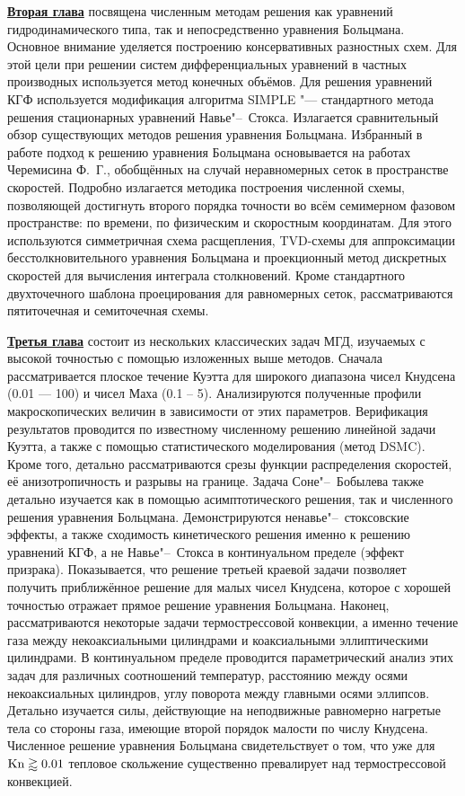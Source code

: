\underline{\textbf{Вторая глава}} посвящена численным методам решения как уравнений гидродинамического типа,
так и непосредственно уравнения Больцмана.
Основное внимание уделяется построению консервативных разностных схем.
Для этой цели при решении систем дифференциальных уравнений в частных производных
используется метод конечных объёмов.
Для решения уравнений КГФ используется модификация алгоритма SIMPLE "--- стандартного метода решения
стационарных уравнений Навье"--~Стокса.
Излагается сравнительный обзор существующих методов решения уравнения Больцмана.
Избранный в работе подход к решению уравнения Больцмана основывается на работах Черемисина Ф.~Г.,
обобщённых на случай неравномерных сеток в пространстве скоростей.
Подробно излагается методика построения численной схемы, позволяющей достигнуть
второго порядка точности во всём семимерном фазовом пространстве:
по времени, по физическим и скоростным координатам.
Для этого используются симметричная схема расщепления, TVD-схемы для аппроксимации
бесстолкновительного уравнения Больцмана и проекционный метод дискретных скоростей
для вычисления интеграла столкновений.
Кроме стандартного двухточечного шаблона проецирования для равномерных сеток,
рассматриваются пятиточечная и семиточечная схемы.

\underline{\textbf{Третья глава}} состоит из нескольких классических задач МГД,
изучаемых с высокой точностью с помощью изложенных выше методов.
Сначала рассматривается плоское течение Куэтта для широкого диапазона чисел Кнудсена (0.01 --- 100)
и чисел Маха (0.1 -- 5). Анализируются полученные профили макроскопических величин в зависимости от
этих параметров. Верификация результатов проводится по известному численному решению линейной задачи Куэтта,
а также с помощью статистического моделирования (метод DSMC).
Кроме того, детально рассматриваются срезы функции распределения скоростей, её анизотропичность и разрывы на границе.
Задача Соне"--~Бобылева также детально изучается как в помощью асимптотического решения,
так и численного решения уравнения Больцмана. Демонстрируются ненавье"--~стоксовские эффекты,
а также сходимость кинетического решения именно к решению уравнений КГФ,
а не Навье"--~Стокса в континуальном пределе (эффект призрака).
Показывается, что решение третьей краевой задачи позволяет получить приближённое решение
для малых чисел Кнудсена, которое с хорошей точностью отражает прямое решение уравнения Больцмана.
Наконец, рассматриваются некоторые задачи термострессовой конвекции, а именно
течение газа между некоаксиальными цилиндрами и коаксиальными эллиптическими цилиндрами.
В континуальном пределе проводится параметрический анализ этих задач для различных соотношений температур,
расстоянию между осями некоаксиальных цилиндров, углу поворота между главными осями эллипсов.
Детально изучается силы, действующие на неподвижные равномерно нагретые тела со стороны газа,
имеющие второй порядок малости по числу Кнудсена.
Численное решение уравнения Больцмана свидетельствует о том, что уже для \(\mathrm{Kn}\gtrapprox0.01\)
тепловое скольжение существенно превалирует над термострессовой конвекцией.

